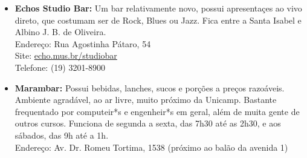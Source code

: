 \begin{itemize}
    \item   \textbf{Echos Studio Bar:} Um bar relativamente novo, possui
        apresentaçes ao vivo direto, que costumam ser de Rock, Blues ou Jazz.
        Fica entre a Santa Isabel e Albino J. B. de Oliveira.
        \\Endereço: Rua Agostinha Pátaro, 54
        \\Site: \url{echo.mus.br/studiobar}
        \\Telefone: (19) 3201-8900

    \item   \textbf{Marambar:} Possui bebidas, lanches, sucos e porções a preços
        razoáveis. Ambiente agradável, ao ar livre, muito próximo da Unicamp.
        Bastante frequentado por computeir*s e engenheir*s em geral, além de
        muita gente de outros cursos. Funciona de segunda a sexta, das 7h30 até
        as 2h30, e aos sábados, das 9h até a 1h.
        \\Endereço: Av. Dr. Romeu Tortima, 1538 (próximo ao balão da avenida 1)
        
\end{itemize}
